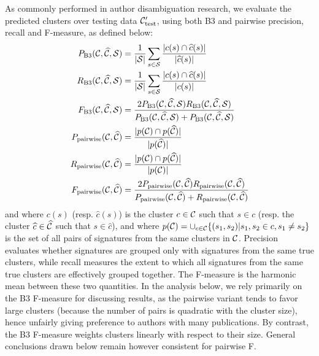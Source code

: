 \documentclass{article}
\begin{document}
As commonly performed in author disambiguation research,
we evaluate the predicted clusters over testing data  ${\cal C}_\text{test}^\prime$,
using both B3 and pairwise precision, recall
and F-measure, as defined below:
\begin{align}
P_\text{B3}({\cal C}, \widehat{\cal C}, {\cal S}) &= \frac{1}{|{\cal S}|} \sum_{s \in {\cal S}} \frac{|c(s) \cap \widehat{c}(s)|}{|\widehat{c}(s)|} \\
R_\text{B3}({\cal C}, \widehat{\cal C}, {\cal S}) &= \frac{1}{|{\cal S}|} \sum_{s \in {\cal S}} \frac{|c(s) \cap \widehat{c}(s)|}{|c(s)|}\\
F_\text{B3}({\cal C}, \widehat{\cal C}, {\cal S}) &= \frac{2 P_\text{B3}({\cal C}, \widehat{\cal C}, {\cal S}) R_\text{B3}({\cal C}, \widehat{\cal C}, {\cal S})}{P_\text{B3}({\cal C}, \widehat{\cal C}, {\cal S}) + P_\text{B3}({\cal C}, \widehat{\cal C}, {\cal S})}\\
P_\text{pairwise}({\cal C}, \widehat{\cal C}) &= \frac{|p({\cal C}) \cap p(\widehat{\cal C})|}{|p(\widehat{\cal C})|}\\
R_\text{pairwise}({\cal C}, \widehat{\cal C}) &= \frac{|p({\cal C}) \cap p(\widehat{\cal C})|}{|p({\cal C})|}\\
F_\text{pairwise}({\cal C}, \widehat{\cal C}) &= \frac{2 P_\text{pairwise}({\cal C}, \widehat{\cal C}) R_\text{pairwise}({\cal C}, \widehat{\cal C})}{P_\text{pairwise}({\cal C}, \widehat{\cal C}) + R_\text{pairwise}({\cal C}, \widehat{\cal C})}
\end{align}
and where $c(s)$ (resp. $\widehat{c}(s)$) is the cluster $c \in {\cal C}$ such that
$s \in c$ (resp. the cluster $\widehat{c} \in \widehat{\cal C}$ such that $s
\in \widehat{c}$), and where $p({\cal C}) = \cup_{c \in {\cal C}} \{ (s_1, s_2)
| s_1, s_2 \in c, s_1 \neq s_2 \}$ is the set of all pairs of signatures from
the same clusters in ${\cal C}$.
Precision evaluates whether signatures are grouped only with signatures from the same true clusters,
while recall measures the extent to which all signatures from the same true clusters are
effectively grouped together.
The F-measure is the harmonic mean between these two quantities.
In the analysis below, we rely primarily on the B3 F-measure for discussing results, as the pairwise variant
tends to favor large clusters (because the number of pairs is quadratic with the cluster size),
hence unfairly giving preference to authors with many publications.
By contrast, the B3 F-measure weights clusters linearly with respect to their size.
General conclusions drawn below remain however consistent for pairwise F.
\end{document}
